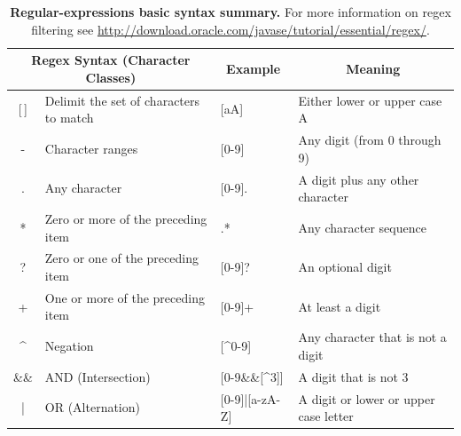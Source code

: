 
\begin{table}[h]
\noindent \caption[Basic syntax of regular-expressions]{\label{tab:regex-syntax}\textbf{Regular-expressions basic syntax
summary.} For more information on regex filtering see
\protect\url{http://download.oracle.com/javase/tutorial/essential/regex/}.}


\noindent %
\begin{tabular}{clll}
\toprule 
\multicolumn{2}{c}{{\footnotesize Regex Syntax (Character Classes)}} & \multicolumn{1}{c}{{\footnotesize Example}} & \multicolumn{1}{c}{{\footnotesize Meaning}}\tabularnewline
\midrule
{\footnotesize {[}\,{]}} & {\footnotesize Delimit the set of characters to match} & {\footnotesize {[}aA{]} } & {\footnotesize Either lower or upper case A}\tabularnewline
{\footnotesize -} & {\footnotesize Character ranges} & {\footnotesize {[}0-9{]} } & {\footnotesize Any digit (from 0 through 9)}\tabularnewline
{\footnotesize .} & {\footnotesize Any character} & {\footnotesize {[}0-9{]}.} & {\footnotesize A digit plus any other character}\tabularnewline
{\footnotesize {*}} & {\footnotesize Zero or more of the preceding item} & {\footnotesize .{*}} & {\footnotesize Any character sequence}\tabularnewline
{\footnotesize ?} & {\footnotesize Zero or one of the preceding item} & {\footnotesize {[}0-9{]}?} & {\footnotesize An optional digit}\tabularnewline
{\footnotesize +} & {\footnotesize One or more of the preceding item} & {\footnotesize {[}0-9{]}+} & {\footnotesize At least a digit}\tabularnewline
{\footnotesize \textasciicircum{}} & {\footnotesize Negation} & {\footnotesize {[}\textasciicircum{}0-9{]}} & {\footnotesize Any character that is not a digit}\tabularnewline
{\footnotesize \&\&} & {\footnotesize AND (Intersection)} & {\footnotesize {[}0-9\&\&{[}\textasciicircum{}3{]}{]}} & {\footnotesize A digit that is not 3}\tabularnewline
{\footnotesize |} & {\footnotesize OR (Alternation)} & {\footnotesize {[}0-9{]}|{[}a-zA-Z{]}} & {\footnotesize A digit or lower or upper case letter}\tabularnewline
\bottomrule
\end{tabular}
\end{table}



